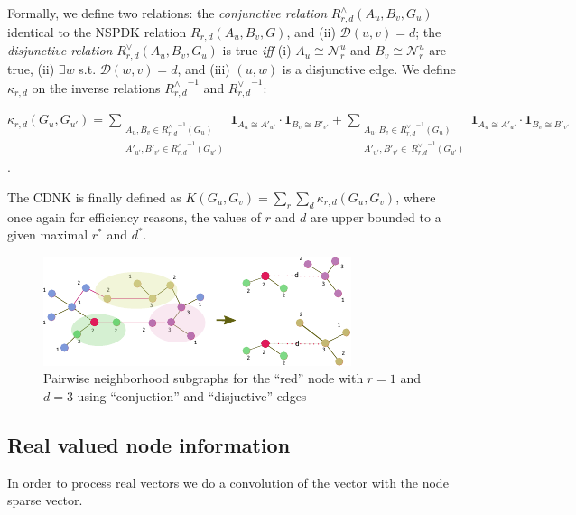 \documentclass[review]{elsarticle}
\begin{document}
Formally, we define two relations: the \textit{conjunctive relation} $R^{\wedge}_{r,d}(A_u, B_v, G_u)$ identical to the NSPDK relation $R_{r,d}(A_u, B_v, G)$,  and (ii) $\mathcal{D}(u,v)= d$; the \textit{disjunctive relation} $R_{r,d}^{\vee}(A_u, B_v, G_u)$ is true {\em iff} (i)  $A_u \cong \mathcal{N}_r^u$ and $B_v \cong \mathcal{N}_r^u$ are true, (ii) $\exists w$ s.t. $\mathcal{D}(w,v)= d$, and (iii) $(u,w)$ is a disjunctive edge. We define $\kappa_{r,d}$ on the  inverse relations ${R^{\wedge}_{r,d}}^{ -1}$ and ${R^{\vee}_{r,d}}^{ -1}$:
\begin{center}
 $\kappa_{r,d}(G_u,G_{u'}) = \!\!\!\!\!\!\!\!\!\!\!\!
 \sum\limits_{\substack {A_u,{B}_{v} \in {R_{r,d}^{\wedge}}^{ -1}(G_u) \\ A'_{u'},{B'}_{v'} \in {R_{r,d}^{\wedge}}^{ -1}(G_{u'}) }} \!\!\!\!\!\!\!\!\!\!\!\!
  { \textbf{1}_{A_u \cong A'_{u'}} \cdot { \textbf{1}_{B_{v} \cong B'_{v'}}}}
+ \!\!\!\!\!\!\!\!\!\!\!\!
 \sum\limits_{\substack {A_u,{B}_{v} \in {R_{r,d}^{\vee}}^{ -1}(G_u) \\
  A'_{u'},{B'}_{v'} \in \ {R_{r,d}^{\vee}}^{ -1}(G_{u'}) }} \!\!\!\!\!\!\!\!\!\!\!\!
  { \textbf{1}_{A_u \cong A'_{u'}} \cdot { \textbf{1}_{B_{v} \cong B'_{v'}}}}
  $.
\end{center}
The CDNK is finally defined as $K(G_u,G_v) = \sum\limits_{r}{\sum\limits_{d}{\kappa_{r,d}(G_u,G_v)}}$, where once again for efficiency reasons, the values of $r$ and $d$ are upper bounded to a given maximal $r^*$ and $d^*$.

\begin{figure}
\centering
\includegraphics[width=.9\textwidth]{cdnk}
\caption{Pairwise neighborhood subgraphs for the ``red'' node with $r=1$ and $d=3$ using ``conjuction'' and ``disjuctive'' edges}
\label{fig:cdnk}
\end{figure}

\subsection{Real valued node information}
In order to process real vectors we do a convolution of the vector with the node sparse vector.
\end{document}
